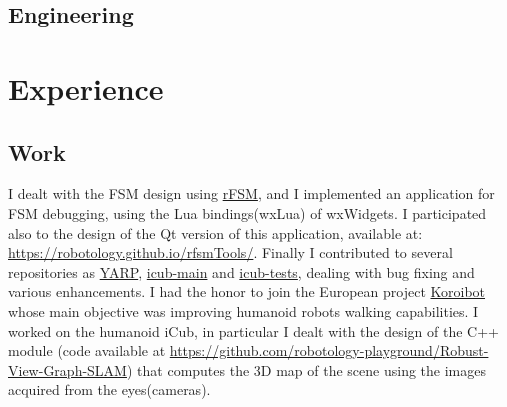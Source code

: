 \documentclass[10pt,a4paper]{moderncv}
\begin{document}
\subsection{Engineering}
\newpage
\section{Experience}
\subsection{Work}
{I dealt with the FSM design using \href{https://people.mech.kuleuven.be/~bruyninc/rFSM/doc/README.html}{rFSM}, and I implemented an application for FSM debugging, using the Lua bindings(wxLua) of wxWidgets. I participated also to the design of the Qt version of this application, available at: \url{https://robotology.github.io/rfsmTools/}.
Finally I contributed to several repositories as \href{https://github.com/robotology/yarp}{YARP}, \href{https://github.com/robotology/icub-main}{icub-main} and \href{https://github.com/robotology/icub-tests}{icub-tests}, dealing with bug fixing and various enhancements.} 
{I had the honor to join the European project \href{http://orb.iwr.uni-heidelberg.de/koroibot/}{Koroibot} whose main objective was improving humanoid robots walking capabilities.
I worked on the humanoid iCub, in particular I dealt with the design of the C++ module (code available at \url{https://github.com/robotology-playground/Robust-View-Graph-SLAM}) that computes the 3D map of the scene using the images acquired from the eyes(cameras).} 
\end{document}
